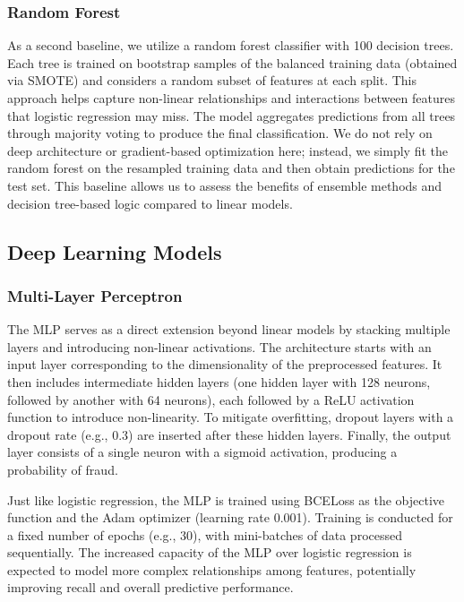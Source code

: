 \documentclass[11pt, oneside]{article}   	%
\begin{document}
\subsubsection{Random Forest}

As a second baseline, we utilize a random forest classifier with 100 decision trees. Each tree is trained on bootstrap samples of the balanced training data (obtained via SMOTE) and considers a random subset of features at each split. This approach helps capture non-linear relationships and interactions between features that logistic regression may miss. The model aggregates predictions from all trees through majority voting to produce the final classification. We do not rely on deep architecture or gradient-based optimization here; instead, we simply fit the random forest on the resampled training data and then obtain predictions for the test set. This baseline allows us to assess the benefits of ensemble methods and decision tree-based logic compared to linear models.

\subsection{Deep Learning Models}

\subsubsection{Multi-Layer Perceptron}

The MLP serves as a direct extension beyond linear models by stacking multiple layers and introducing non-linear activations. The architecture starts with an input layer corresponding to the dimensionality of the preprocessed features. It then includes intermediate hidden layers (one hidden layer with 128 neurons, followed by another with 64 neurons), each followed by a ReLU activation function to introduce non-linearity. To mitigate overfitting, dropout layers with a dropout rate (e.g., 0.3) are inserted after these hidden layers. Finally, the output layer consists of a single neuron with a sigmoid activation, producing a probability of fraud.

Just like logistic regression, the MLP is trained using BCELoss as the objective function and the Adam optimizer (learning rate 0.001). Training is conducted for a fixed number of epochs (e.g., 30), with mini-batches of data processed sequentially. The increased capacity of the MLP over logistic regression is expected to model more complex relationships among features, potentially improving recall and overall predictive performance.
\end{document}

